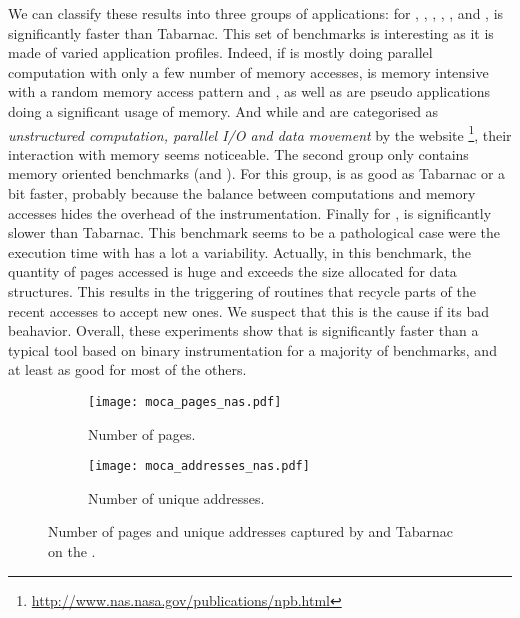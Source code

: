 We can classify these results into three groups of
applications:  for \BT, \DC, \EP, \IS, \LU, \SP and \UA, \Moca is
significantly faster than Tabarnac. This set of benchmarks is interesting as it is made of varied application profiles.
Indeed, if \EP is mostly doing parallel computation with only a few number of
memory accesses, \IS is memory intensive with a random memory access pattern and
\BT, \LU as well as \SP are pseudo applications doing a significant usage of memory.
And while \DC and \UA are categorised as \emph{unstructured computation,
parallel I/O and data movement} by the \NPB website
\footnote{\url{http://www.nas.nasa.gov/publications/npb.html}}, their interaction with memory seems noticeable.
The second group only contains memory oriented benchmarks (\CG and \FT). For this group,
\Moca is as good as Tabarnac or a bit faster, probably because the balance between computations and memory accesses hides the overhead of the instrumentation.
Finally for \MG, \Moca is
significantly slower than Tabarnac. This benchmark seems to be a pathological
case were the execution time with \Moca has a lot a variability. Actually, in this benchmark, the quantity of pages accessed is huge and exceeds the size
allocated for \Moca data structures. This results in the triggering of \Moca routines that recycle parts of the recent accesses to accept new ones.
We suspect that this is the cause if its bad beahavior.
Overall, these experiments show that \Moca is significantly faster than a typical tool based on binary instrumentation
for a majority of benchmarks, and at least as good for most of the others.

\begin{figure}[htb]
    \centering
    \begin{subfigure}{\linewidth}
        \texttt{[image: moca\_pages\_nas.pdf]}
        \caption{Number of pages.}
        \label{fig:pages}
    \end{subfigure}
    \begin{subfigure}{\linewidth}
        \texttt{[image: moca\_addresses\_nas.pdf]}
        \caption{Number of unique addresses.}
        \label{fig:addr}
    \end{subfigure}
    \caption{Number of pages and unique addresses captured by \Moca and Tabarnac
    on the \NPB.}
    \label{fig:pages-addr}
\end{figure}

